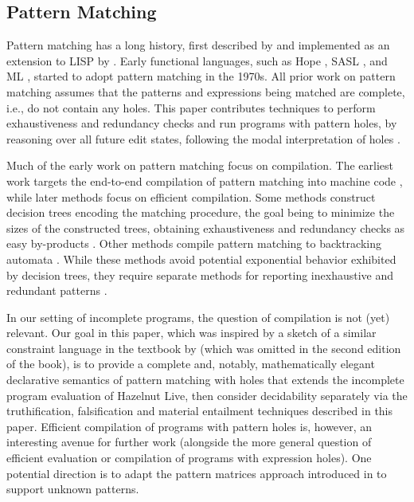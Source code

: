 \subsection{Pattern Matching}
Pattern matching has a long history, first described by \citet{DBLP:journals/cj/Burstall69} and implemented as an extension to LISP by \citet{DBLP:phd/ethos/McBride70}. Early functional languages,
such as Hope \cite{DBLP:conf/lfp/BurstallMS80}, SASL \cite{DBLP:journals/spe/Turner79}, and ML \cite{DBLP:journals/jcss/Milner78}, started to adopt pattern matching in the 1970s.
All prior work on pattern matching assumes that the patterns and expressions being matched are
complete, i.e., do not contain any holes.
This paper contributes techniques to perform exhaustiveness and redundancy checks and run programs with pattern holes, by 
reasoning over all future edit states,
following the modal interpretation of holes \cite{DBLP:journals/tocl/NanevskiPP08,DBLP:journals/pacmpl/OmarVCH19}.

Much of the early work on pattern matching focus on compilation. The earliest work targets the end-to-end compilation of pattern matching into machine code \cite{DBLP:conf/lfp/Cardelli84,DBLP:conf/lfp/Augustsson84,DBLP:conf/fpca/Augustsson85}, while later methods focus on efficient compilation. Some methods construct decision trees encoding the matching procedure, the goal being to minimize the sizes of the constructed trees, obtaining exhaustiveness and redundancy checks as easy by-products \cite{Aitken92smlnj,Baudinet85treepattern,Sestoft96mlpattern}.
Other methods compile pattern matching to backtracking automata \cite{Maranget94lazybacktracking,DBLP:journals/jfp/Maranget07}. 
While these methods avoid potential exponential behavior exhibited by decision trees, they require separate methods for reporting inexhaustive and redundant patterns \cite{DBLP:journals/jfp/Maranget07}.

In our setting of incomplete programs, the question of compilation is not (yet) relevant. Our goal in this paper, which was inspired by a sketch of a similar constraint language in the textbook by \citet{Harper2012} (which was omitted in the second edition of the book), is to provide a complete and, notably, mathematically elegant declarative semantics of pattern matching with holes that extends the incomplete program evaluation of Hazelnut Live, then consider decidability separately via the truthification, falsification and material entailment techniques described in this paper. 
Efficient compilation of programs with pattern holes is, however, an interesting avenue for further work (alongside the more general question of efficient evaluation or compilation of programs with expression holes). One potential direction is to adapt the pattern matrices approach introduced in \citet{DBLP:journals/jfp/Maranget07} to support unknown patterns.

